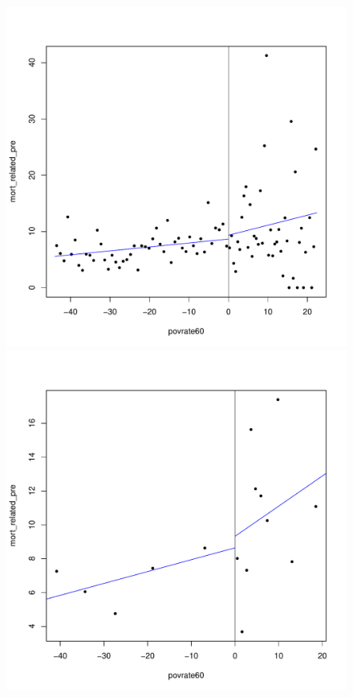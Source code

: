 \documentclass[12pt]{article}
\begin{document}
\begin{figure}[htpb!]
\begin{minipage}{0.5\textwidth}
        \includegraphics[width=1\textwidth]{q2-1-esmv.pdf}
    \end{minipage}
\centering
\begin{minipage}{0.5\textwidth}
        \includegraphics[width=1\textwidth]{q2-1-qs.pdf}

\end{minipage}
\end{figure}
\end{document}
